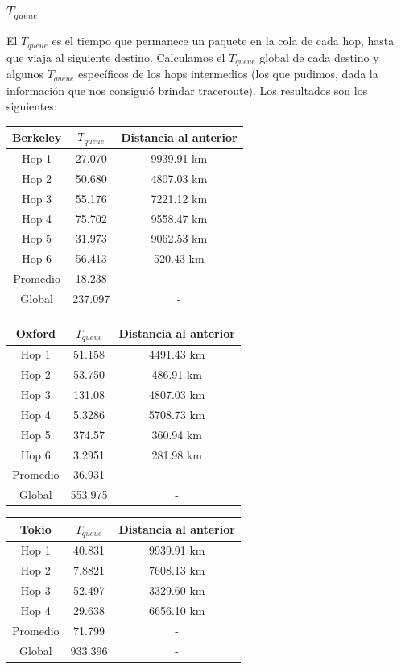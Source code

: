 \subsubsection{$T_{queue}$}

El $T_{queue}$ es el tiempo que permanece un paquete en la cola de cada hop, hasta que viaja al siguiente destino. Calculamos el $T_{queue}$ global de cada destino y algunos $T_{queue}$ específicos de los hops intermedios (los que pudimos, dada la información que nos consiguió brindar traceroute). Los resultados son los siguientes:\\

\begin{center}
\begin{tabular}{| c | c | c |}	\hline
	Berkeley 	& $T_{queue}$	& Distancia al anterior 	\\ \hline
	Hop 1	& 27.070		& 9939.91 km			\\ \hline
	Hop 2	& 50.680		& 4807.03 km		\\ \hline
	Hop 3	& 55.176		& 7221.12 km 	\\ \hline
	Hop 4	& 75.702		& 9558.47 km 	\\ \hline
	Hop 5	& 31.973		& 9062.53 km	 \\ \hline
	Hop 6	& 56.413		& 520.43 km	\\ \hline
	Promedio & 18.238	& -	\\ \hline
	Global	& 237.097	& -	\\ \hline
\end{tabular}
\vspace{1cm}
\begin{tabular}{| c | c | c |}	\hline
	Oxford 	& $T_{queue}$	& Distancia al anterior 	\\ \hline
	Hop 1	& 51.158		& 4491.43 km			\\ \hline
	Hop 2	& 53.750		& 486.91 km		\\ \hline
	Hop 3	& 131.08		& 4807.03 km 	\\ \hline
	Hop 4	& 5.3286		& 5708.73 km 	\\ \hline
	Hop 5	& 374.57 	& 360.94 km	 \\ \hline
	Hop 6	& 3.2951 	& 281.98 km	\\ \hline
	Promedio & 36.931	& -	\\ \hline
	Global	& 553.975	& -	\\ \hline
\end{tabular}
\vspace{1cm}
\begin{tabular}{| c | c | c |}	\hline
	Tokio 	& $T_{queue}$	& Distancia al anterior 	\\ \hline
	Hop 1	& 40.831 	& 9939.91 km			\\ \hline
	Hop 2	& 7.8821		& 7608.13 km		\\ \hline
	Hop 3	& 52.497		& 3329.60 km 	\\ \hline
	Hop 4	& 29.638		& 6656.10 km 	\\ \hline
	Promedio & 71.799	& -	\\ \hline
	Global	& 933.396	& -	\\ \hline
\end{tabular}
\end{center}